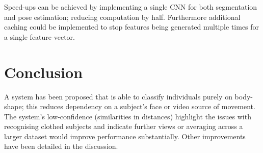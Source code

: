 \documentclass[conference]{IEEEtran}
\begin{document}
\noindent Speed-ups can be achieved by implementing a single CNN for both segmentation and pose estimation; reducing computation by half. Furthermore additional caching could be implemented to stop features being generated multiple times for a single feature-vector.


\section{Conclusion}
\noindent A system has been proposed that is able to classify individuals purely on body-shape; this reduces dependency on a subject's face or video source of movement. The system's low-confidence (similarities in distances) highlight the issues with recognising clothed subjects and indicate further views or averaging across a larger dataset would improve performance substantially. Other improvements have been detailed in the discussion.




\end{document}
